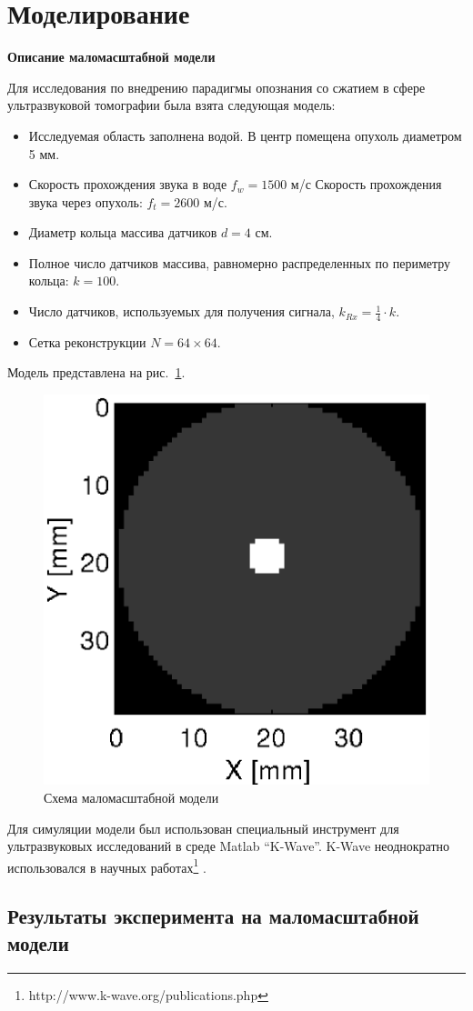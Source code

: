 \documentclass[14pt]{matmex-diploma}
\begin{document}
\section{Моделирование} \label{sec:modeling}

\textbf{Описание маломасштабной модели} \label{sec:model_desc}

Для исследования по внедрению парадигмы опознания со сжатием в сфере ультразвуковой томографии была взята следующая модель:
\begin{itemize}
\item Исследуемая область заполнена водой. В центр помещена опухоль диаметром 5 мм.
\item Скорость прохождения звука в воде $f_w = 1500$ м/с Скорость прохождения звука через опухоль: $f_t = 2600$ м/с.
\item Диаметр кольца массива датчиков $d = 4 $ см.
\item Полное число датчиков массива, равномерно распределенных по периметру кольца: $k = 100$.
\item Число датчиков, используемых для получения сигнала, $k_{Rx} = \frac{1}{4} \cdot k$.
\item Сетка реконструкции $N = 64\times 64$.
\end{itemize}
Модель представлена на рис.~\ref{fig:model_1}.

\begin{figure}[h]
\centering
    \includegraphics[width=.4\textwidth]{pics_eps/model.eps}
    \caption{\small Схема маломасштабной модели}
    \label{fig:model_1}
\end{figure}

Для симуляции модели был использован специальный инструмент для ультразвуковых исследований в среде Matlab ``K-Wave''. K-Wave неоднократно использовался в научных работах\footnote{http://www.k-wave.org/publications.php} \cite{treeby2010k}. \\


\subsection{Результаты эксперимента на маломасштабной модели}
\end{document}
